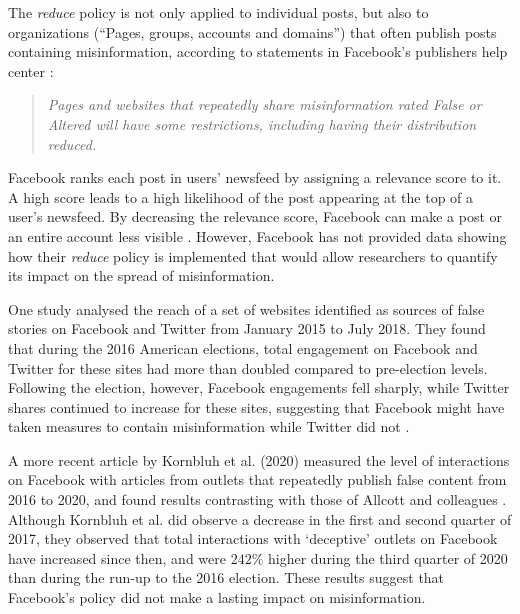 \documentclass[review]{elsarticle}
\begin{document}
The \textit{reduce} policy is not only applied to individual posts, but also to organizations (``Pages, groups, accounts and domains'') that often publish posts containing misinformation, according to statements in Facebook’s publishers help center \citep{factCheckingRules, repeatOffenderCommunication}:
\begin{quote}
\emph{Pages and websites that repeatedly share misinformation rated False or Altered will have some restrictions, including having their distribution reduced.}
\end{quote}

Facebook ranks each post in users’ newsfeed by assigning a relevance score to it. 
A high score leads to a high likelihood of the post appearing at the top of a user's newsfeed. 
By decreasing the relevance score, Facebook can make a post or an entire account less visible \citep{threePartRecipe}.
However, Facebook has not provided data showing how their {\it reduce} policy is implemented that would allow researchers to quantify its impact on the spread of misinformation. 

One study analysed the reach of a set of websites identified as sources of false stories on Facebook and Twitter from January 2015 to July 2018. 
They found that during the 2016 American elections, total engagement on Facebook and Twitter for these sites had more than doubled compared to pre-election levels. 
Following the election, however, Facebook engagements fell sharply, while Twitter shares continued to increase for these sites, suggesting that Facebook might have taken measures to contain misinformation while Twitter did not \cite{allcott2019trends}. 

A more recent article by Kornbluh et al. (2020) \cite{kornbluh2020new} measured the level of interactions on Facebook with articles from outlets that repeatedly publish false content from 2016 to 2020, and found results contrasting with those of Allcott and colleagues \cite{allcott2019trends}. 
Although Kornbluh et al. did observe a decrease in the first and second quarter of 2017, they observed that total interactions with ‘deceptive’ outlets on Facebook have increased since then, and were $242\%$ higher during the third quarter of 2020 than during the run-up to the 2016 election. 
These results suggest that Facebook’s policy did not make a lasting impact on misinformation. 
\end{document}
